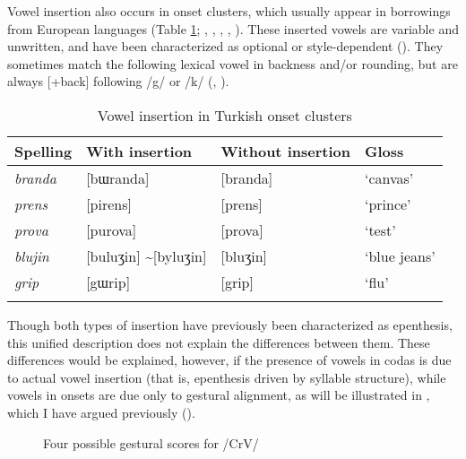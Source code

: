 \documentclass[output=paper,colorlinks,citecolor=brown]{langscibook}
\begin{document}
Vowel insertion also occurs in onset clusters, which usually appear in borrowings from European languages (Table \ref{Vonset}; \citealt{Yavas1980}, \citealt{ClementsSezer:1982}, \citealt{Kaun1999}, \citealt{Yildiz2010}, \citealt{Kabak2011}). These inserted vowels are variable and unwritten, and have been characterized as optional \citep{Yildiz2010} or style-dependent (\citealt{ClementsSezer:1982}). They sometimes match the following lexical vowel in backness and/or rounding, but are always [+back] following /g/ or /k/ (\citealt{ClementsSezer:1982}, \citealt{Kabak2011}).

 
\begin{table}
\caption{Vowel insertion in Turkish onset clusters}
\label{Vonset}
\begin{tabular}{llll}
\lsptoprule
Spelling & With insertion & Without insertion & Gloss \\\midrule
\textit{branda} &	[bɯranda] &	[branda] &	`canvas'\\
\textit{prens} &	[pirens] &	[prens]	& `prince'\\
\textit{prova} &	[purova] &	[prova] &	`test'\\
\textit{blujin} &	[buluʒin] \sim [byluʒin] & 	[bluʒin] &	`blue jeans'\\
\textit{grip} & 	[gɯrip]	& [grip]	& `flu'\\
\lspbottomrule                
\end{tabular}
\end{table}

Though both types of insertion have previously been characterized as epenthesis, this unified description does not explain the differences between them. These differences would be explained, however, if the presence of vowels in codas is due to actual vowel insertion (that is, epenthesis driven by syllable structure), while vowels in onsets are due only to gestural alignment, as will be illustrated in , which I have argued previously (\cite{Bellik2018,Bellik2019b,Bellik2019a}).

\begin{figure}
\caption{Four possible gestural scores for /CrV/}

\hfill
{}

\hfill
{}
\label{abcd}
\end{figure}
\end{document}

